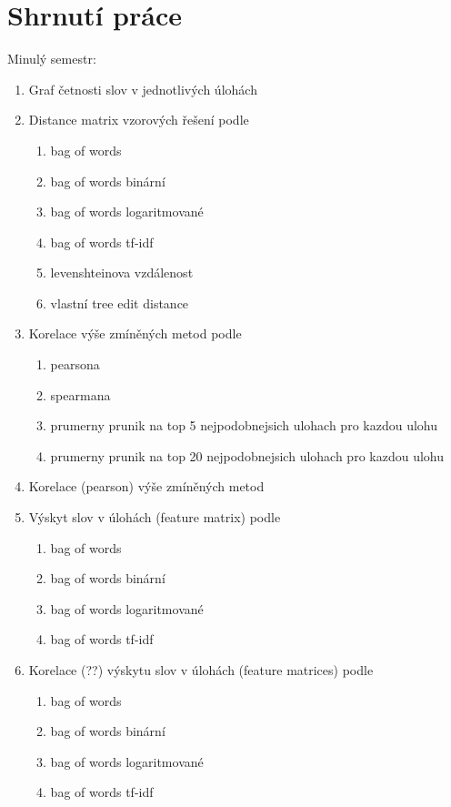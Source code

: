 \documentclass[
  digital, %
  table,   %
  nolof,     %
  nolot,     %
]{fithesis3}
\begin{document}
\chapter{Shrnutí práce}
Minulý semestr:
\begin{enumerate}
	\item Graf četnosti slov v jednotlivých úlohách
	\item Distance matrix vzorových řešení podle
	\begin{enumerate}
		\item bag of words
		\item bag of words binární
		\item bag of words logaritmované
		\item bag of words tf-idf
		\item levenshteinova vzdálenost
		\item vlastní tree edit distance
	\end{enumerate}
	\item Korelace výše zmíněných metod podle
	\begin{enumerate}
		\item pearsona
		\item spearmana
		\item prumerny prunik na top 5 nejpodobnejsich ulohach pro kazdou ulohu
		\item prumerny prunik na top 20 nejpodobnejsich ulohach pro kazdou ulohu
	\end{enumerate}
	\item Korelace (pearson) výše zmíněných metod
	\item Výskyt slov v úlohách (feature matrix) podle
	\begin{enumerate}
		\item bag of words
		\item bag of words binární
		\item bag of words logaritmované
		\item bag of words tf-idf
	\end{enumerate}
	\item Korelace (??) výskytu slov v úlohách (feature matrices) podle
	\begin{enumerate}
		\item bag of words
		\item bag of words binární
		\item bag of words logaritmované
		\item bag of words tf-idf
	\end{enumerate}
\end{enumerate}
\end{document}
